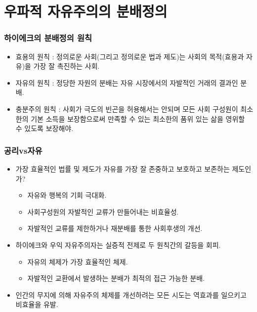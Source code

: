 \documentclass[aspectratio=169,xcolor=dvipsnames,handout]{beamer}
\begin{document}
\section{우파적 자유주의의 분배정의}
\begin{frame}[<+->]
\frametitle{하이에크의 분배정의 원칙}
    \begin{itemize}
        \item 효용의 원칙 : 정의로운 사회(그리고 정의로운 법과 제도)는 사회의 목적(효용과 자유)을 가장 잘 촉진하는 사회.
        \item 자유의 원칙 : 정당한 자원의 분배는 자유 시장에서의 자발적인 거래의 결과인 분배.
        \item 충분주의 원칙 : 사회가 극도의 빈곤을 허용해서는 안되며 모든 사회 구성원이 최소한의 기본 소득을 보장함으로써 만족할 수 있는 최소한의 품위 있는 삶을 영위할 수 있도록 보장해야.
    \end{itemize}
\end{frame}

\begin{frame}[<+->]
\frametitle{공리vs자유}
    \begin{itemize}
        \item 가장 효율적인 법률 및 제도가 자유를 가장 잘 존중하고 보호하고 보존하는 제도인가?
        \begin{itemize}
            \item  자유와 행복의 기회 극대화.
            \item  사회구성원의 자발적인 교류가 만들어내는 비효율성.
            \item  자발적인 교류를 제한하거나 재분배를 통한 사회후생의 개선.
        \end{itemize}
        \item 하이에크와 우익 자유주의자는 실증적 전제로 두 원칙간의 갈등을 회피.
        \begin{itemize}
            \item  자유의 체제가 가장 효율적인 체제.
            \item  자발적인 교환에서 발생하는 분배가 최적의 접근 가능한 분배.
        \end{itemize}
        \item  인간의 무지에 의해 자유주의 체제를 개선하려는 모든 시도는 역효과를 일으키고 비효율을 유발.
    \end{itemize}
\end{frame}
\end{document}
